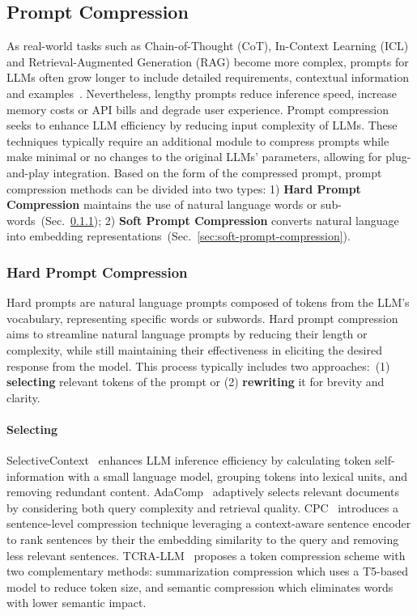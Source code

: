 \documentclass[11pt, a4paper, logo, copyright, nonumbering]{map}
\begin{document}
\subsection{Prompt Compression}
\label{sec:prompt_compression}
As real-world tasks such as Chain-of-Thought (CoT), In-Context Learning (ICL) and Retrieval-Augmented Generation (RAG) become more complex, prompts for LLMs often grow longer to include detailed requirements, contextual information and  examples~\cite{li2024promptcompressionlargelanguage}. Nevertheless, lengthy prompts reduce inference speed, increase memory costs or API bills and degrade user experience. Prompt compression seeks to enhance LLM efficiency by reducing input complexity of LLMs. These techniques typically require an additional module to compress prompts while make minimal or no changes to the original LLMs' parameters, allowing for plug-and-play integration. Based on the form of the compressed prompt, prompt compression methods can be divided into two types: 1) \textbf{Hard Prompt Compression} maintains the use of natural language words or sub-words~(Sec.~\ref{sec:hard-prompt-compression}); 2) \textbf{Soft Prompt Compression} converts natural language into embedding representations~(Sec.~\ref{sec:soft-prompt-compression}).

\subsubsection{Hard Prompt Compression}
\label{sec:hard-prompt-compression}
Hard prompts are natural language prompts composed of tokens from the LLM's vocabulary, representing specific words or subwords. Hard prompt compression aims to streamline natural language prompts by reducing their length or complexity, while still maintaining their effectiveness in eliciting the desired response from the model.
This process typically includes two approaches:~(1) \textbf{selecting} relevant tokens of the prompt or (2) \textbf{rewriting} it for brevity and clarity.

\paragraph{Selecting}
SelectiveContext~\cite{li-etal-2023-compressing} enhances LLM inference efficiency by calculating token self-information with a small language model, grouping tokens into lexical units, and removing redundant content.
AdaComp~\cite{zhang2024adacompextractivecontextcompression} adaptively selects relevant documents by considering both query complexity and retrieval quality. CPC~\cite{liskavets2024promptcompressioncontextawaresentence} introduces a sentence-level compression technique leveraging a context-aware sentence encoder to rank sentences by their the embedding similarity to the query and removing less relevant sentences. TCRA-LLM~\cite{liu-etal-2023-tcra} proposes a token compression scheme with two complementary methods: summarization compression which uses a T5-based model to reduce token size, and semantic compression which eliminates words with lower semantic impact.
\end{document}
